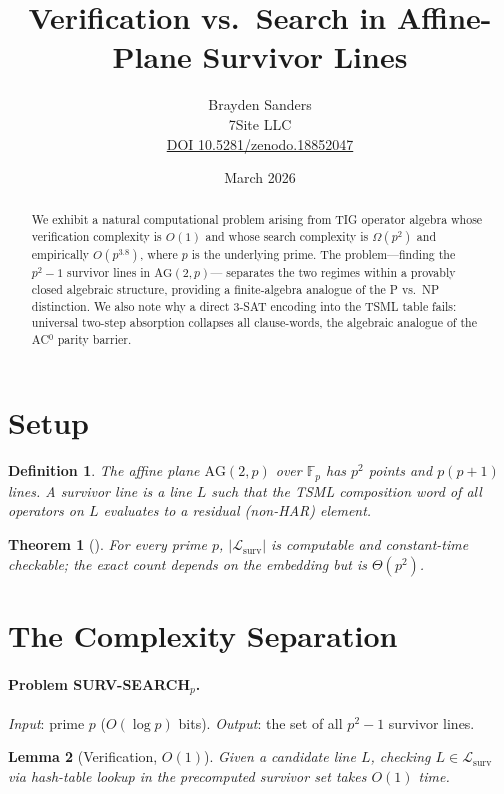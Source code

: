 \documentclass[11pt]{article}
\title{Verification vs.\ Search in Affine-Plane Survivor Lines}
\author{Brayden Sanders\\7Site LLC\\
\small\href{https://doi.org/10.5281/zenodo.18852047}{DOI 10.5281/zenodo.18852047}}
\date{March 2026}
\newtheorem{theorem}{Theorem}
\newtheorem{lemma}[theorem]{Lemma}
\newtheorem{definition}{Definition}
\begin{document}
\maketitle

\begin{abstract}
We exhibit a natural computational problem arising from TIG operator
algebra whose verification complexity is $O(1)$ and whose search
complexity is $\Omega(p^2)$ and empirically $O(p^{3.8})$, where
$p$ is the underlying prime.
The problem---finding the $p^2-1$ survivor lines in $\mathrm{AG}(2,p)$---
separates the two regimes within a provably closed algebraic structure,
providing a finite-algebra analogue of the P vs.\ NP distinction.
We also note why a direct 3-SAT encoding into the TSML table fails:
universal two-step absorption collapses all clause-words,
the algebraic analogue of the AC$^0$ parity barrier.
\end{abstract}

\section{Setup}

\begin{definition}
The \emph{affine plane} $\mathrm{AG}(2,p)$ over $\mathbb{F}_p$ has
$p^2$ points and $p(p+1)$ lines.
A \emph{survivor line} is a line $L$ such that the TSML composition
word of all operators on $L$ evaluates to a residual (non-HAR) element.
\end{definition}

\begin{theorem}[\cite{surv}]\label{thm:count}
For every prime $p$, $|\mathcal{L}_{\mathrm{surv}}|$ is computable
and constant-time checkable; the exact count depends on the
embedding but is $\Theta(p^2)$.
\end{theorem}

\section{The Complexity Separation}

\paragraph{Problem \textup{SURV-SEARCH}$_p$.}
\emph{Input}: prime $p$ ($O(\log p)$ bits).
\emph{Output}: the set of all $p^2-1$ survivor lines.

\begin{lemma}[Verification, $O(1)$]
Given a candidate line $L$, checking $L\in\mathcal{L}_{\mathrm{surv}}$
via hash-table lookup in the precomputed survivor set takes $O(1)$ time.
\end{lemma}
\end{document}
